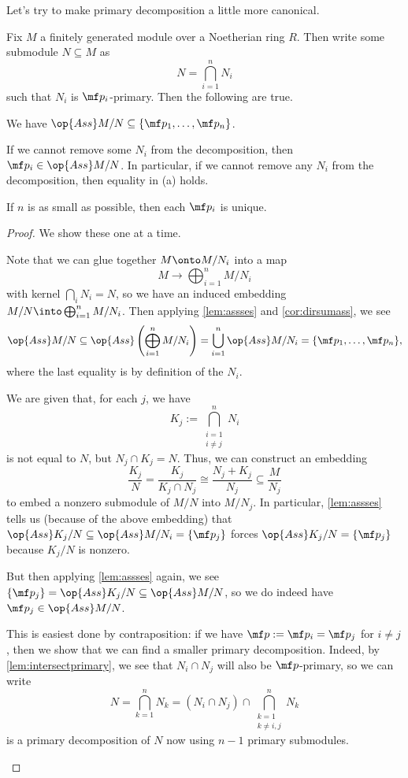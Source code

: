 \documentclass[../notes.tex]{subfiles}
\begin{document}
Let's try to make primary decomposition a little more canonical.
\begin{theorem} \label{thm:primdecompii}
	Fix $M$ a finitely generated module over a Noetherian ring $R$. Then write some submodule $N\subseteq M$ as
	\[N=\bigcap_{i=1}^nN_i\]
	such that $N_i$ is $\mf p_i$-primary. Then the following are true.
	\begin{listalph}
		\item We have $\op{Ass}M/N\subseteq\{\mf p_1,\ldots,\mf p_n\}$.
		\item If we cannot remove some $N_i$ from the decomposition, then $\mf p_i\in\op{Ass}M/N$. In particular, if we cannot remove any $N_i$ from the decomposition, then equality in (a) holds.
		\item If $n$ is as small as possible, then each $\mf p_i$ is unique.
	\end{listalph}
\end{theorem}
\begin{proof}
	We show these one at a time.
	\begin{listalph}
		\item Note that we can glue together $M\onto M/N_i$ into a map
		\[M\to\bigoplus_{i=1}^nM/N_i\]
		with kernel $\bigcap_iN_i=N$, so we have an induced embedding $M/N\into\bigoplus_{i=1}^nM/N_i$. Then applying \autoref{lem:assses} and \autoref{cor:dirsumass}, we see
		\[\op{Ass}M/N\subseteq\op{Ass}\left(\bigoplus_{i=1}^nM/N_i\right)=\bigcup_{i=1}^n\op{Ass}M/N_i=\{\mf p_1,\ldots,\mf p_n\},\]
		where the last equality is by definition of the $N_i$.

		\item We are given that, for each $j$, we have
		\[K_j:=\bigcap_{\substack{i=1\\i\ne j}}^nN_i\]
		is not equal to $N$, but $N_j\cap K_j=N$. Thus, we can construct an embedding
		\[\frac{K_j}N=\frac{K_j}{K_j\cap N_j}\cong\frac{N_j+K_j}{N_j}\subseteq\frac M{N_j}\]
		to embed a nonzero submodule of $M/N$ into $M/N_j$. In particular, \autoref{lem:assses} tells us (because of the above embedding) that $\op{Ass}K_j/N\subseteq\op{Ass}M/N_i=\{\mf p_j\}$ forces $\op{Ass}K_j/N=\{\mf p_j\}$ because $K_j/N$ is nonzero.
		
		But then applying \autoref{lem:assses} again, we see $\{\mf p_j\}=\op{Ass}K_j/N\subseteq\op{Ass}M/N$, so we do indeed have $\mf p_j\in\op{Ass}M/N$.

		\item This is easiest done by contraposition: if we have $\mf p:=\mf p_i=\mf p_j$ for $i\ne j$, then we show that we can find a smaller primary decomposition. Indeed, by \autoref{lem:intersectprimary}, we see that $N_i\cap N_j$ will also be $\mf p$-primary, so we can write
		\[N=\bigcap_{k=1}^nN_k=(N_i\cap N_j)\cap\bigcap_{\substack{k=1\\k\ne i,j}}^nN_k\]
		is a primary decomposition of $N$ now using $n-1$ primary submodules.
		\qedhere
	\end{listalph}
\end{proof}
\end{document}
